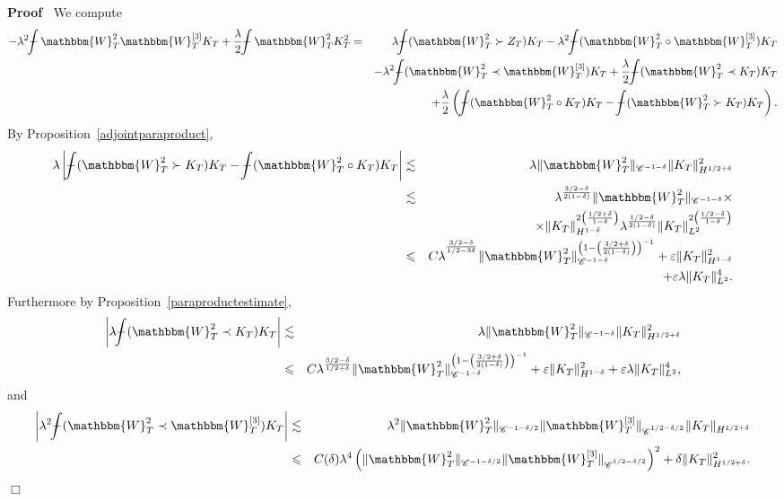 \documentclass[11pt, oneside]{article}   	%
\newenvironment{proof}{\noindent\textbf{Proof\ }}{\hspace*{\fill}$\Box$\medskip}
\def\Xint#1{\mathchoice
{\XXint\displaystyle\textstyle{#1}}%
{\XXint\textstyle\scriptstyle{#1}}%
{\XXint\scriptstyle\scriptscriptstyle{#1}}%
{\XXint\scriptscriptstyle\scriptscriptstyle{#1}}%
\!\int}
\def\XXint#1#2#3{{\setbox0=\hbox{$#1{#2#3}{\int}$ }
\vcenter{\hbox{$#2#3$ }}\kern-.6\wd0}}
\def\dashint{\Xint-}
\newcommand{\bint}{\dashint}
\newcommand{\VV}{\mathscr{C}}
\begin{document}
\begin{proof}
  We compute
  \begin{eqnarray*}
    - \lambda^2 \bint \mathbbm{W}^2_T \mathbbm{W}_T^{[3]} K_T +
    \frac{\lambda}{2} \bint \mathbbm{W}^2_T K_T^2 & = & \lambda \bint
    (\mathbbm{W}^2_T \succ Z_T) K_T - \lambda^2 \bint (\mathbbm{W}^2_T \circ
    \mathbbm{W}_T^{[3]}) K_T\\
    &  & - \lambda^2 \bint (\mathbbm{W}^2_T \prec \mathbbm{W}_T^{[3]}) K_T +
    \frac{\lambda}{2} \bint (\mathbbm{W}^2_T \prec K_T) K_T\\
    &  & + \frac{\lambda}{2} \left( \bint (\mathbbm{W}^2_T \circ K_T) K_T -
    \bint (\mathbbm{W}^2_T \succ K_T) K_T \right) .
  \end{eqnarray*}
  By Proposition~\ref{adjointparaproduct},
  \begin{eqnarray*}
    \lambda \left| \bint (\mathbbm{W}^2_T \succ K_T) K_T  -  \bint
    (\mathbbm{W}^2_T \circ K_T) K_T \right| &  \lesssim &  \lambda \|
    \mathbbm{W}^2_T \|_{\VV^{- 1 - \delta}}  \| K_T \|^2_{H^{1 / 2 +
    \delta}}\\
    & \lesssim & \lambda^{\frac{3 / 2 - \delta}{2 (1 - \delta)}} \|
    \mathbbm{W}^2_T \|_{\VV^{- 1 - \delta}} \times \\ & & \times \| K_T \|^{2 \left( \frac{1 / 2 +
    \delta}{1 - \delta} \right)}_{H^{1 - \delta}} \lambda^{\frac{1 / 2 -
    \delta}{2 (1 - \delta)}} \| K_T \|^{2 \left( \frac{1 / 2 - \delta}{1 -
    \delta} \right)}_{L^2}\\
    & \leqslant & C \lambda^{^{\frac{3 / 2 - \delta}{1 / 2 - 3 \delta}}} \|
    \mathbbm{W}^2_T \|^{\left( 1 - \left( \frac{3 / 2 + \delta}{2 (1 -
    \delta)} \right) \right)^{- 1}}_{\VV^{- 1 - \delta}} + \varepsilon \| K_T
    \|^2_{H^{1 - \delta}}\\
    &  & + \varepsilon \lambda \| K_T \|^4_{L^2} .
  \end{eqnarray*}
  Furthermore by Proposition~\ref{paraproductestimate},
  \begin{eqnarray*}
    \left| \lambda \bint (\mathbbm{W}^2_T \prec K_T) K_T \right| & \lesssim &
    \lambda \| \mathbbm{W}^2_T \|_{\VV^{- 1 - \delta}}  \| K_T \|^2_{H^{1 /
    2 + \delta}}\\
    & \leqslant & C \lambda^{\frac{3 / 2 - \delta}{1 / 2 + \delta}} \|
    \mathbbm{W}^2_T \|^{\left( 1 - \left( \frac{3 / 2 + \delta}{2 (1 -
    \delta)} \right) \right)^{- 1}}_{\VV^{- 1 - \delta}} + \varepsilon \| K_T
    \|^2_{H^{1 - \delta}} + \varepsilon \lambda \| K_T \|^4_{L^2},
  \end{eqnarray*}
  and
  \begin{eqnarray*}
    \left| \lambda^2 \bint (\mathbbm{W}^2_T \prec \mathbbm{W}_T^{[3]}) K_T
    \right| & \lesssim & \lambda^2 \| \mathbbm{W}^2_T \|_{\VV^{- 1 - \delta /
    2}}  \| \mathbbm{W}_T^{[3]} \|_{\VV^{^{1 / 2 - \delta / 2}}} \| K_T
    \|_{H^{1 / 2 + \delta}}\\
    & \leqslant & C (\delta) \lambda^4 \left( \| \mathbbm{W}^2_T \|_{\VV^{- 1
    - \delta / 2}}  \| \mathbbm{W}_T^{[3]} \|_{\VV^{^{1 / 2 - \delta / 2}}}
    \right)^2 + \delta \| K_T \|^2_{H^{1 / 2 + \delta}} .
  \end{eqnarray*}
\end{proof}
\end{document}
